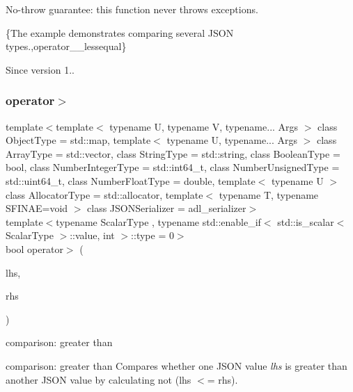 No-\/throw guarantee\+: this function never throws exceptions.

\{The example demonstrates comparing several J\+S\+ON types.,operator\+\_\+\+\_\+lessequal\}

\begin{DoxySince}{Since}
version 1.. 
\end{DoxySince}
\mbox{\label{classnlohmann_1_1basic__json_a124c319566198d9f092c5bebea46ce77}} 
\subsubsection{\texorpdfstring{operator$>$}{operator>}\hspace{0.1cm}{\footnotesize\ttfamily [3/3]}}
{\footnotesize\ttfamily template$<$template$<$ typename U, typename V, typename... Args $>$ class Object\+Type = std\+::map, template$<$ typename U, typename... Args $>$ class Array\+Type = std\+::vector, class String\+Type  = std\+::string, class Boolean\+Type  = bool, class Number\+Integer\+Type  = std\+::int64\+\_\+t, class Number\+Unsigned\+Type  = std\+::uint64\+\_\+t, class Number\+Float\+Type  = double, template$<$ typename U $>$ class Allocator\+Type = std\+::allocator, template$<$ typename T, typename S\+F\+I\+N\+A\+E=void $>$ class J\+S\+O\+N\+Serializer = adl\+\_\+serializer$>$ \\
template$<$typename Scalar\+Type , typename std\+::enable\+\_\+if$<$ std\+::is\+\_\+scalar$<$ Scalar\+Type $>$\+::value, int $>$\+::type  = 0$>$ \\
bool operator$>$ (\begin{DoxyParamCaption}\item[{const Scalar\+Type}]{lhs,  }\item[{\mbox{\hyperlink{classnlohmann_1_1basic__json_a4057c5425f4faacfe39a8046871786ca}{const\+\_\+reference}}}]{rhs }\end{DoxyParamCaption})\hspace{0.3cm}{\ttfamily [friend]}}



comparison\+: greater than 

comparison\+: greater than Compares whether one J\+S\+ON value {\itshape lhs} is greater than another J\+S\+ON value by calculating {\ttfamily not (lhs $<$= rhs)}.


